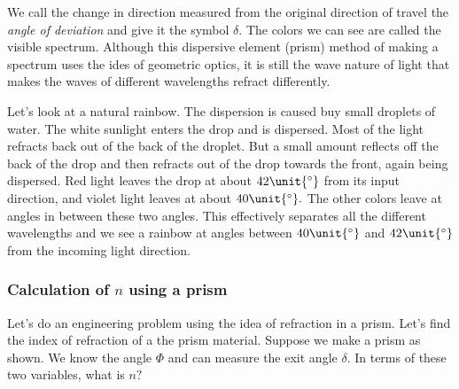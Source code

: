 \documentclass{article}
\begin{document}
We call the change in direction measured from the original direction of
travel the \emph{angle of deviation} and give it the symbol $\delta $. The
colors we can see are called the visible spectrum. Although this dispersive
element (prism) method of making a spectrum uses the ides of geometric
optics, it is still the wave nature of light that makes the waves of
different wavelengths refract differently.

Let's look at a natural rainbow. The dispersion is caused buy small droplets
of water. The white sunlight enters the drop and is dispersed. Most of the
light refracts back out of the back of the droplet. But a small amount
reflects off the back of the drop and then refracts out of the drop towards
the front, again being dispersed. Red light leaves the drop at about $42%
\unit{%
{{}^\circ}%
}$ from its input direction, and violet light leaves at about $40\unit{%
{{}^\circ}%
}.$ The other colors leave at angles in between these two angles.%
This effectively separates all the different wavelengths and we see a
rainbow at angles between $40\unit{%
{{}^\circ}%
}$ and $42\unit{%
{{}^\circ}%
}$ from the incoming light direction.

\subsubsection{Calculation of $n$ using a prism}

Let's do an engineering problem using the idea of refraction in a prism.
Let's find the index of refraction of a the prism material. Suppose we make
a prism as shown. We know the angle $\Phi $ and can measure the exit angle $%
\delta .$ In terms of these two variables, what is $n?$

\end{document}
